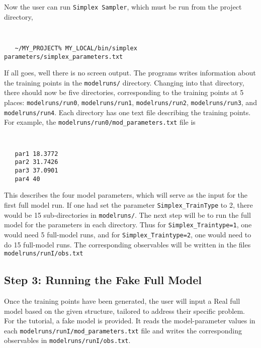 \documentclass[UserManual.tex]{subfiles}
\begin{document}
Now the user can run {\tt Simplex Sampler}, which must be run from the project directory,
 {\tt
\begin{verbatim}
   ~/MY_PROJECT% MY_LOCAL/bin/simplex parameters/simplex_parameters.txt
\end{verbatim}
}
If all goes, well there is no screen output. The programs writes information about the training points in the {\tt modelruns/} directory. Changing into that directory, there should now be five directories, corresponding to the training points at 5 places: {\tt modelruns/run0}, {\tt modelruns/run1}, {\tt modelruns/run2}, {\tt modelruns/run3}, and {\tt modelruns/run4}. Each directory has one text file describing the training points. For example, the {\tt modelruns/run0/mod\_parameters.txt} file is 
{\tt
\begin{verbatim}
   par1 18.3772
   par2 31.7426
   par3 37.0901
   par4 40
\end{verbatim}
}
This describes the four model parameters, which will serve as the input for the first full model run. If one had set the parameter {\tt Simplex\_TrainType} to 2, there would be 15 sub-directories in {\tt modelruns/}. The next step will be to run the full model for the parameters in each directory. Thus for {\tt Simplex\_Traintype=1}, one would need 5 full-model runs, and for {\tt Simplex\_Traintype=2}, one would need to do 15 full-model runs. The corresponding observables will be written in the files {\tt modelruns/runI/obs.txt}

\subsection{Step 3: Running the Fake Full Model}
Once the training points have been generated, the user will input a Real full model based on the given structure, tailored to address their specific problem. For the tutorial, a fake model is provided. It reads the model-parameter values in each {\tt modelruns/runI/mod_parameters.txt} file and writes the corresponding observables in {\tt modelruns/runI/obs.txt}. 
\end{document}
